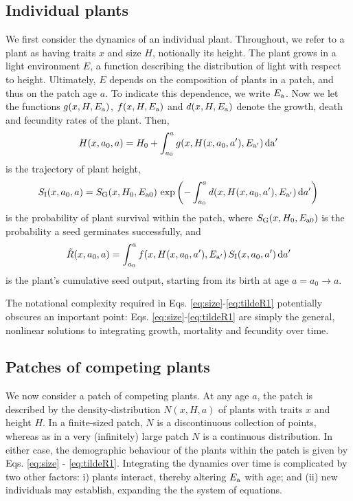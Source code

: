 \documentclass[10pt,twoside]{article}
\begin{document}
\subsection{Individual plants}\label{individual-plants}

We first consider the dynamics of an individual plant. Throughout, we refer to a
plant as having traits \(x\) and size \(H\), notionally its height. The
plant grows in a light environment \(E\), a function describing the distribution
of light with respect to height. Ultimately, \(E\) depends on the
composition of plants in a patch, and thus on the patch age \(a\). To indicate this dependence, we
write \(E_{\rm a}\). Now we let the functions \(g(x, H, E_{\rm a})\), \(f(x, H, E_{\rm a})\) and
\(d(x, H, E_{\rm a})\) denote the growth, death and fecundity rates of the
plant. Then,
\begin{equation} \label{eq:size}
  H(x, a_0, a) = H_0 + \int_{a_0}^{a} g(x, H(x, a_0, a^\prime), E_{\rm a^\prime}) \, \rm{d}a^\prime
\end{equation}
is the trajectory of plant height,
\begin{equation} \label{eq:survivalIndividual}
  S_{\rm I} (x, a_0, a) = S_{\rm G} (x, H_0, E_{{\rm a}0}) \, \exp\left(- \int_{a_0}^{a} d(x, H(x, a_0, a^\prime), E_{\rm a^\prime}) \, {\rm d} a^\prime \right)
\end{equation}
is the probability of plant survival within the patch, where \(S_{\rm G} (x, H_0, E_{{\rm a}0})\)
is the probability a seed germinates successfully, and
\begin{equation} \label{eq:tildeR1}
  \tilde{R}(x, a_0, a) = \int_{a_0}^{a} f(x, H(x, a_0, a^\prime), E_{\rm a^\prime}) \, S_{\rm I} (x, a_0, a^\prime) \, {\rm d} a^\prime
\end{equation}
is the plant's cumulative seed output, starting from its birth at age
\(a = a_0 \rightarrow a\).

The notational complexity required in Eqs. \ref{eq:size}-\ref{eq:tildeR1} potentially obscures an important point: Eqs.
\ref{eq:size}-\ref{eq:tildeR1} are simply the general, nonlinear solutions to
integrating growth, mortality and fecundity over time.

\subsection{Patches of competing plants}\label{patches-of-competing-plants-size-structured-populations}

We now consider a patch of competing plants. At any age \(a\), the
patch is described by the density-distribution \(N(x, H, a)\) of plants
with traits \(x\) and height \(H\). In a finite-sized patch, \(N\) is a
discontinuous collection of points, whereas as in a very (infinitely) large patch
\(N\) is a continuous distribution. In either case, the demographic
behaviour of the plants within the patch is given by Eqs. \ref{eq:size}
- \ref{eq:tildeR1}. Integrating the dynamics over time is complicated by
two other factors: i) plants interact, thereby altering \(E_{\rm a}\) with
age; and (ii) new individuals may establish, expanding the the system of
equations.
\end{document}
